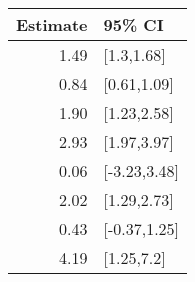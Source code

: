 \begin{tabular}{rl}
  \hline
Estimate & 95\% CI \\ 
  \hline
1.49 & [1.3,1.68] \\ 
  0.84 & [0.61,1.09] \\ 
  1.90 & [1.23,2.58] \\ 
  2.93 & [1.97,3.97] \\ 
  0.06 & [-3.23,3.48] \\ 
  2.02 & [1.29,2.73] \\ 
  0.43 & [-0.37,1.25] \\ 
  4.19 & [1.25,7.2] \\ 
   \hline
\end{tabular}

